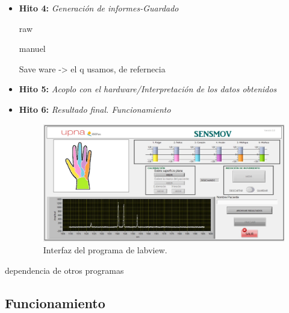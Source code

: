 \begin{itemize} [label=]
\begin{itemize} [label=]
		Cada uno de los dedos tiene su propio rango de movimiento. 
		
		
		
		\item \underline{\textit{Bloque de elementos decorativos: }} Como elementos decorativos se tiene una barra superior y la huella de la mano. La huella de la mano sirve además como leyenda esquemática de los colores del indicador de movimiento.
		
		 	
	\end{itemize}
	
	
	
	\item \textbf{Hito 4:} \textit{Generación de informes-Guardado}
	
	raw
	
	manuel 
	
	
	Save ware -> el q usamos, de refernecia
	
	

	\item \textbf{Hito 5:} \textit{Acoplo con el hardware/Interpretación de los datos obtenidos}
	
	
	
	\item \textbf{Hito 6:} \textit{Resultado final. Funcionamiento}
	
		
	\begin{figure}[H]
		\centering
		\includegraphics[width=1\textwidth]{./img/interfazSM}
		\caption{Interfaz del programa de labview.}
		\label{fig:interfazSM}
	\end{figure}
	
	
\end{itemize}







dependencia de otros programas


\subsection{Funcionamiento}
\label{sec:funcionamiento3}


